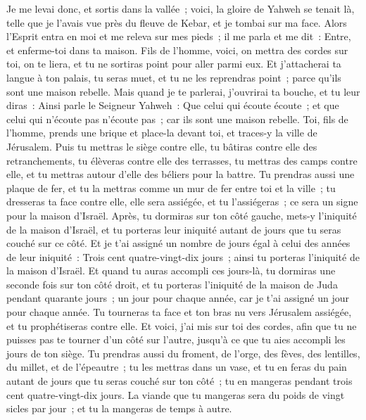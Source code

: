 \begin{multicols}{2}
Je me levai donc, et sortis dans la vallée~; voici, la gloire de Yahweh se tenait là, telle que je l'avais vue près du fleuve de Kebar, et je tombai sur ma face.
Alors l'Esprit entra en moi et me releva sur mes pieds~; il me parla et me dit~: Entre, et enferme-toi dans ta maison.
Fils de l'homme, voici, on mettra des cordes sur toi, on te liera, et tu ne sortiras point pour aller parmi eux.
 Et j'attacherai ta langue à ton palais, tu seras muet, et tu ne les reprendras point~; parce qu'ils sont une maison rebelle.
Mais quand je te parlerai, j'ouvrirai ta bouche, et tu leur diras~: Ainsi parle le Seigneur Yahweh~: Que celui qui écoute écoute~; et que celui qui n'écoute pas n'écoute pas~; car ils sont une maison rebelle.
\VerseOne{}Toi, fils de l'homme, prends une brique et place-la devant toi, et traces-y la ville de Jérusalem.
Puis tu mettras le siège contre elle, tu bâtiras contre elle des retranchements, tu élèveras contre elle des terrasses, tu mettras des camps contre elle, et tu mettras autour d'elle des béliers pour la battre.
Tu prendras aussi une plaque de fer, et tu la mettras comme un mur de fer entre toi et la ville~; tu dresseras ta face contre elle, elle sera assiégée, et tu l'assiégeras~; ce sera un signe pour la maison d'Israël.
Après, tu dormiras sur ton côté gauche, mets-y l'iniquité de la maison d'Israël, et tu porteras leur iniquité autant de jours que tu seras couché sur ce côté.
Et je t'ai assigné un nombre de jours égal à celui des années de leur iniquité~: Trois cent quatre-vingt-dix jours~; ainsi tu porteras l'iniquité de la maison d'Israël.
Et quand tu auras accompli ces jours-là, tu dormiras une seconde fois sur ton côté droit, et tu porteras l'iniquité de la maison de Juda pendant quarante jours~; un jour pour chaque année, car je t'ai assigné un jour pour chaque année.
Tu tourneras ta face et ton bras nu vers Jérusalem assiégée, et tu prophétiseras contre elle.
Et voici, j'ai mis sur toi des cordes, afin que tu ne puisses pas te tourner d'un côté sur l'autre, jusqu'à ce que tu aies accompli les jours de ton siège.
Tu prendras aussi du froment, de l'orge, des fèves, des lentilles, du millet, et de l'épeautre~; tu les mettras dans un vase, et tu en feras du pain autant de jours que tu seras couché sur ton côté~; tu en mangeras pendant trois cent quatre-vingt-dix jours.
La viande que tu mangeras sera du poids de vingt sicles par jour~; et tu la mangeras de temps à autre.

\end{multicols}
